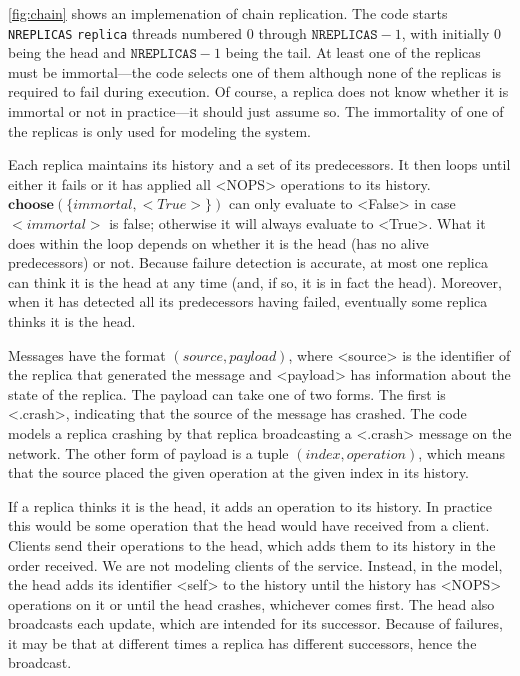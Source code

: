 \documentclass{report}
\begin{document}
\autoref{fig:chain} shows an implemenation of chain replication.
The code starts \texttt{NREPLICAS} \texttt{replica} threads numbered
0 through $\mathtt{NREPLICAS} - 1$, with initially 0 being the head
and $\mathtt{NREPLICAS} - 1$ being the tail.  At least one of the replicas 
must be immortal---the code selects one of them although none of the
replicas is required to fail during execution.
Of course, a replica does not know whether it is immortal
or not in practice---it should just assume so.
The immortality of one of the replicas is only used for modeling the system.

Each replica maintains its history and a set of its predecessors.
It then loops until either it fails or it has applied all
<{NOPS}> operations to its history.
$\mathbf{choose}(\{ \mathit{immortal}, <{True}> \})$ can only
evaluate to <{False}> in case $<{immortal}>$ is false; otherwise
it will always evaluate to <{True}>.
What it does within the loop depends on whether it is the head
(has no alive predecessors) or not.
Because failure detection is accurate, at most one replica can think
it is the head at any time (and, if so, it is in fact the head).
Moreover, when it has
detected all its predecessors having failed, eventually some replica
thinks it is the head.

Messages have the format $(\mathit{source}, \mathit{payload})$,
where <{source}> is the identifier of the replica that generated
the message and <{payload}> has information about the state of
the replica.  The payload can take one of two forms.  The first is
<{.crash}>, indicating that the source of the message has
crashed.  The code models a replica crashing by that replica broadcasting
a <{.crash}> message on the network.
The other form of payload is a tuple
$(\mathit{index}, \mathit{operation})$, which means that the source
placed the given operation at the given index in its history.

If a replica thinks it is the head, it adds an operation to its
history.
In practice this would be some operation that the head would have received
from a client.  Clients send their operations to the head, which adds them
to its history in the order received.
We are not modeling clients of the service.
Instead, in the model, the head adds its identifier <{self}> to the
history until the
history has <{NOPS}> operations on it or until the head crashes,
whichever comes first.  The head also broadcasts each update, which
are intended for its successor.  Because of failures, it may be that
at different times a replica has different successors, hence the
broadcast.
\end{document}
